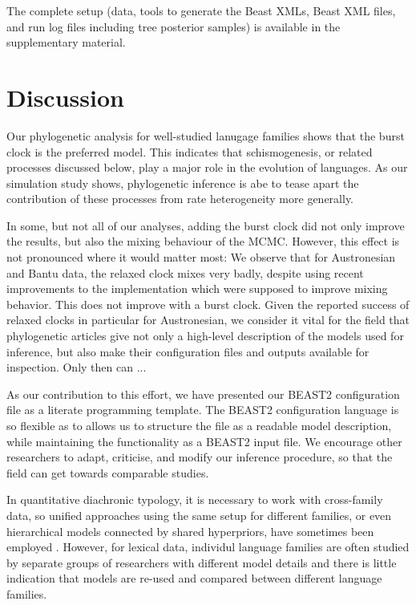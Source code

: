 \documentclass[a4paper,12pt]{scrartcl}
\begin{document}
The complete setup (data, tools to generate the Beast XMLs, Beast XML files, and
run log files including tree posterior samples) is available in the
supplementary material.

\section{Discussion}

Our phylogenetic analysis for well-studied lanugage families shows that the
burst clock is the preferred model. This indicates that schismogenesis, or
related processes discussed below, play a major role in the evolution of
languages. As our simulation study shows, phylogenetic inference is abe to tease
apart the contribution of these processes from rate heterogeneity more
generally.

In some, but not all of our analyses, adding the burst clock did not only
improve the results, but also the mixing behaviour of the MCMC. However, this
effect is not pronounced where it would matter most: We observe that for
Austronesian and Bantu data, the relaxed clock mixes very badly, despite using
recent improvements to the implementation which were supposed to improve mixing
behavior. This does not improve with a burst clock. Given the reported success
of relaxed clocks in particular for Austronesian, we consider it vital for the
field that phylogenetic articles give not only a high-level description of the
models used for inference, but also make their configuration files and outputs
available for inspection. Only then can ...

As our contribution to this effort, we have presented our BEAST2 configuration
file as a literate programming template. The BEAST2 configuration language is so
flexible as to allows us to structure the file as a readable model description,
while maintaining the functionality as a BEAST2 input file. We encourage other
researchers to adapt, criticise, and modify our inference procedure, so that the
field can get towards comparable studies.

In quantitative diachronic typology, it is necessary to work with cross-family
data, so unified approaches using the same setup for different families, or even
hierarchical models connected by shared hyperpriors, have sometimes been
employed \parencite{dunn2011evolved,jager2021phylogenetic}. However, for lexical
data, individul language families are often studied by separate groups of
researchers with different model details and there is little indication that
models are re-used and compared between different language families.
\end{document}
